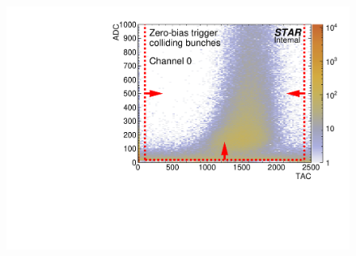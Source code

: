 \begin{figure}[t]
{  \includegraphics[width=\linewidth,page=48]{graphics/eventSelection/bbc/Bbc_ADCvsTAC_collidingBunches.pdf}
}%
\end{figure}
